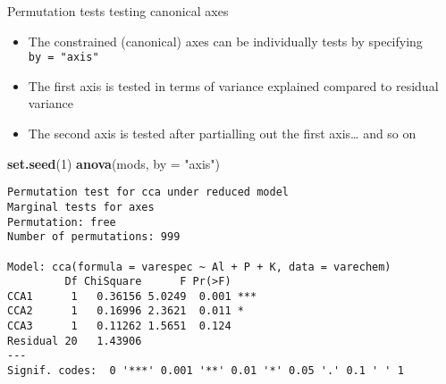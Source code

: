\documentclass[10pt,ignorenonframetext,compress, aspectratio=169]{beamer}
\newenvironment{Shaded}{\begin{snugshade}}{\end{snugshade}}
\newcommand{\KeywordTok}[1]{\textcolor[rgb]{0.13,0.29,0.53}{\textbf{{#1}}}}
\newcommand{\DataTypeTok}[1]{\textcolor[rgb]{0.13,0.29,0.53}{{#1}}}
\newcommand{\DecValTok}[1]{\textcolor[rgb]{0.00,0.00,0.81}{{#1}}}
\newcommand{\StringTok}[1]{\textcolor[rgb]{0.31,0.60,0.02}{{#1}}}
\newcommand{\NormalTok}[1]{{#1}}
\begin{document}
\begin{frame}[fragile]{Permutation tests \textbar{} testing canonical
axes}

\begin{itemize}
\itemsep1pt\parskip0pt
\item
  The constrained (canonical) axes can be individually tests by
  specifying \texttt{by\ =\ "axis"}
\item
  The first axis is tested in terms of variance explained compared to
  residual variance
\item
  The second axis is tested after partialling out the first axis\ldots{}
  and so on
\end{itemize}

\tiny

\begin{Shaded}
\begin{Highlighting}[]
\KeywordTok{set.seed}\NormalTok{(}\DecValTok{1}\NormalTok{)}
\KeywordTok{anova}\NormalTok{(mods, }\DataTypeTok{by =} \StringTok{"axis"}\NormalTok{)}
\end{Highlighting}
\end{Shaded}

\begin{verbatim}
Permutation test for cca under reduced model
Marginal tests for axes
Permutation: free
Number of permutations: 999

Model: cca(formula = varespec ~ Al + P + K, data = varechem)
         Df ChiSquare      F Pr(>F)    
CCA1      1   0.36156 5.0249  0.001 ***
CCA2      1   0.16996 2.3621  0.011 *  
CCA3      1   0.11262 1.5651  0.124    
Residual 20   1.43906                  
---
Signif. codes:  0 '***' 0.001 '**' 0.01 '*' 0.05 '.' 0.1 ' ' 1
\end{verbatim}

\normalsize

\end{frame}
\end{document}
